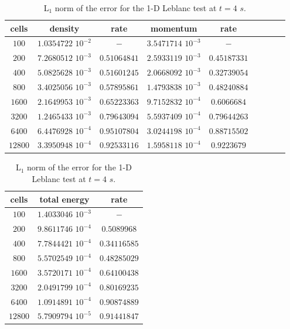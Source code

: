 \begin{table}[H]
\begin{center}
 \caption{\label{tbl:l1_norm_leblanc} L$_1$ norm of the error for the 1-D Leblanc test at $t=4$ $s$.}
 \begin{tabular}{|c|c|c|c|c|c|c|c|c|}
 \hline
  cells & density               & rate         & momentum              & rate         \\ \hline 
$100$   & $1.0354722$ $10^{-2}$ & $-$          & $3.5471714$ $10^{-3}$ & $-$       \\  \hline
$200$   & $7.2680512$ $10^{-3}$ & $0.51064841$ & $2.5933119$ $10^{-3}$ & $0.45187331$  \\ \hline
$400$   & $5.0825628$ $10^{-3}$ & $0.51601245$ & $2.0668092$ $10^{-3}$ & $0.32739054$  \\ \hline
$800$   & $3.4025056$ $10^{-3}$ & $0.57895861$ & $1.4793838$ $10^{-3}$ & $0.48240884$  \\ \hline
$1600$  & $2.1649953$ $10^{-3}$ & $0.65223363$ & $9.7152832$ $10^{-4}$ & $0.6066684$   \\ \hline
$3200$  & $1.2465433$ $10^{-3}$ & $0.79643094$ & $5.5937409$ $10^{-4}$ & $0.79644263$ \\ \hline
$6400$  & $6.4476928$ $10^{-4}$ & $0.95107804$ & $3.0244198$ $10^{-4}$ & $0.88715502$ \\ \hline
$12800$ & $3.3950948$ $10^{-4}$ & $0.92533116$ & $1.5958118$ $10^{-4}$ & $0.9223679$  \\ \hline
\end{tabular}
\begin{tabular}{|c|c|c|}
\hline
cells & total energy          & rate         \\  \hline
$100$   & $1.4033046$ $10^{-3}$ & $-$          \\  \hline
$200$   & $9.8611746$ $10^{-4}$ & $0.5089968$  \\  \hline
$400$   & $7.7844421$ $10^{-4}$ & $0.34116585$ \\  \hline
$800$   & $5.5702549$ $10^{-4}$ & $0.48285029$ \\  \hline
$1600$   & $3.5720171$ $10^{-4}$ & $0.64100438$ \\  \hline
$3200$   & $2.0491799$ $10^{-4}$ & $0.80169235$ \\  \hline
$6400$   & $1.0914891$ $10^{-4}$ & $0.90874889$ \\  \hline
$12800$   & $5.7909794$ $10^{-5}$ & $0.91441847$ \\  \hline
 \end{tabular}
\end{center}
\end{table}
